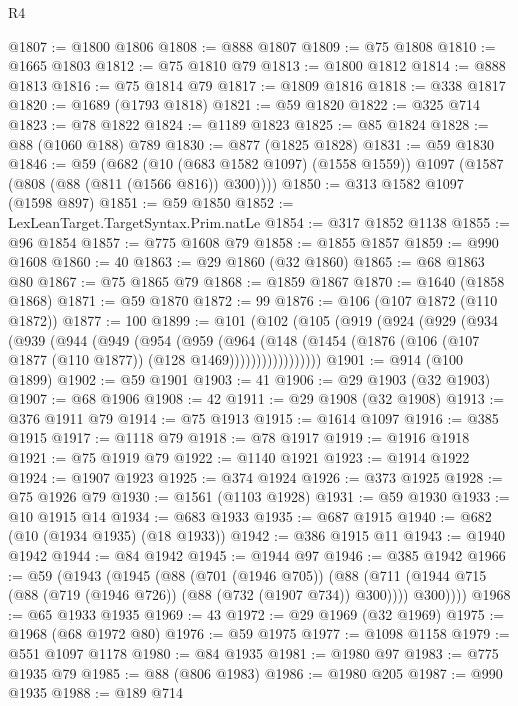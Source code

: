 \begin{lexlean}{R4}
\begin{coremodule}
{{{{{{{{{{{{{{{{{{{{{{{{{{{{{{{{{{{{{{{{{{{{{{{{{{{{{{{{{{{{{{{{{{{{{{{{{{{{{{{{{{{{{{{{{{{{@1807 := @1800 @1806
@1808 := @888 @1807
@1809 := @75 @1808
@1810 := @1665 @1803
@1812 := @75 @1810 @79
@1813 := @1800 @1812
@1814 := @888 @1813
@1816 := @75 @1814 @79
@1817 := @1809 @1816
@1818 := @338 @1817
@1820 := @1689 (@1793 @1818)
@1821 := @59 @1820
@1822 := @325 @714
@1823 := @78 @1822
@1824 := @1189 @1823
@1825 := @85 @1824
@1828 := @88 (@1060 @188) @789
@1830 := @877 (@1825 @1828)
@1831 := @59 @1830
@1846 := @59
    (@682
      (@10 (@683 @1582 @1097) (@1558 @1559))
      @1097
      (@1587 (@808 (@88 (@811 (@1566 @816)) @300))))
@1850 := @313 @1582 @1097 (@1598 @897)
@1851 := @59 @1850
@1852 := LexLeanTarget.TargetSyntax.Prim.natLe
@1854 := @317 @1852 @1138
@1855 := @96 @1854
@1857 := @775 @1608 @79
@1858 := @1855 @1857
@1859 := @990 @1608
@1860 := 40
@1863 := @29 @1860 (@32 @1860)
@1865 := @68 @1863 @80
@1867 := @75 @1865 @79
@1868 := @1859 @1867
@1870 := @1640 (@1858 @1868)
@1871 := @59 @1870
@1872 := 99
@1876 := @106 (@107 @1872 (@110 @1872))
@1877 := 100
@1899 := @101
    (@102
      (@105
        (@919
          (@924
            (@929
              (@934
                (@939
                  (@944
                    (@949
                      (@954
                        (@959
                          (@964
                            (@148
                              (@1454
                                (@1876 (@106 (@107 @1877 (@110 @1877)) (@128 @1469)))))))))))))))))
@1901 := @914 (@100 @1899)
@1902 := @59 @1901
@1903 := 41
@1906 := @29 @1903 (@32 @1903)
@1907 := @68 @1906
@1908 := 42
@1911 := @29 @1908 (@32 @1908)
@1913 := @376 @1911 @79
@1914 := @75 @1913
@1915 := @1614 @1097
@1916 := @385 @1915
@1917 := @1118 @79
@1918 := @78 @1917
@1919 := @1916 @1918
@1921 := @75 @1919 @79
@1922 := @1140 @1921
@1923 := @1914 @1922
@1924 := @1907 @1923
@1925 := @374 @1924
@1926 := @373 @1925
@1928 := @75 @1926 @79
@1930 := @1561 (@1103 @1928)
@1931 := @59 @1930
@1933 := @10 @1915 @14
@1934 := @683 @1933
@1935 := @687 @1915
@1940 := @682 (@10 (@1934 @1935) (@18 @1933))
@1942 := @386 @1915 @11
@1943 := @1940 @1942
@1944 := @84 @1942
@1945 := @1944 @97
@1946 := @385 @1942
@1966 := @59
    (@1943
      (@1945
        (@88
          (@701 (@1946 @705))
          (@88 (@711 (@1944 @715 (@88 (@719 (@1946 @726)) (@88 (@732 (@1907 @734)) @300)))) @300))))
@1968 := @65 @1933 @1935
@1969 := 43
@1972 := @29 @1969 (@32 @1969)
@1975 := @1968 (@68 @1972 @80)
@1976 := @59 @1975
@1977 := @1098 @1158
@1979 := @551 @1097 @1178
@1980 := @84 @1935
@1981 := @1980 @97
@1983 := @775 @1935 @79
@1985 := @88 (@806 @1983)
@1986 := @1980 @205
@1987 := @990 @1935
@1988 := @189 @714
}}}}}}}}}}}}}}}}}}}}}}}}}}}}}}}}}}}}}}}}}}}}}}}}}}}}}}}}}}}}}}}}}}}}}}}}}}}}}}}}}}}}}}}}}}}}
\end{coremodule}
\end{lexlean}
